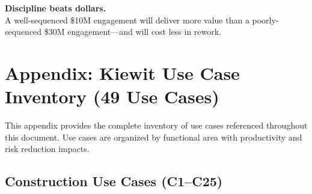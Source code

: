 \documentclass[11pt, letterpaper]{article}
\begin{document}
\vspace{1em}

\begin{center}
\large\textbf{Discipline beats dollars.}\\[0.3em]
\normalsize A well-sequenced \$10M engagement will deliver more value than a poorly-sequenced \$30M engagement---and will cost less in rework.
\end{center}

\newpage

\appendix

\section*{Appendix: Kiewit Use Case Inventory (49 Use Cases)}

This appendix provides the complete inventory of use cases referenced throughout this document. Use cases are organized by functional area with productivity and risk reduction impacts.

\subsection*{Construction Use Cases (C1--C25)}
\end{document}
